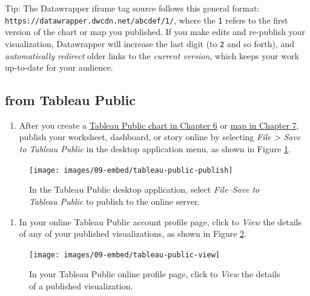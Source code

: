 \documentclass[
  english,
]{book}
\providecommand{\tightlist}{%
  \setlength{\itemsep}{0pt}\setlength{\parskip}{0pt}}
\begin{document}
Tip: The Datawrapper iframe tag source follows this general format: \texttt{https://datawrapper.dwcdn.net/abcdef/1/}, where the \texttt{1} refers to the first version of the chart or map you published. If you make edits and re-publish your visualization, Datawrapper will increase the last digit (to \texttt{2} and so forth), and \emph{automatically redirect} older links to the \emph{current version}, which keeps your work up-to-date for your audience.

\hypertarget{from-tableau-public}{%
\subsection*{from Tableau Public}\label{from-tableau-public}}

\begin{enumerate}
\def\labelenumi{\arabic{enumi}.}
\tightlist
\item
  After you create a \href{chart-tableau.html}{Tableau Public chart in Chapter 6} or \href{map-tableau.html}{map in Chapter 7}, publish your worksheet, dashboard, or story online by selecting \emph{File \textgreater{} Save to Tableau Public} in the desktop application menu, as shown in Figure \ref{fig:tableau-public-publish}.
\end{enumerate}



\begin{figure}
\texttt{[image: images/09-embed/tableau-public-publish]} \caption{In the Tableau Public desktop application, select \emph{File--Save to Tableau Public} to publish to the online server.}\label{fig:tableau-public-publish}
\end{figure}

\begin{enumerate}
\def\labelenumi{\arabic{enumi}.}
\setcounter{enumi}{1}
\tightlist
\item
  In your online Tableau Public account profile page, click to \emph{View} the details of any of your published visualizations, as shown in Figure \ref{fig:tableau-public-view}.
\end{enumerate}



\begin{figure}
\texttt{[image: images/09-embed/tableau-public-view]} \caption{In your Tableau Public online profile page, click to \emph{View} the details of a published visualization.}\label{fig:tableau-public-view}
\end{figure}
\end{document}
